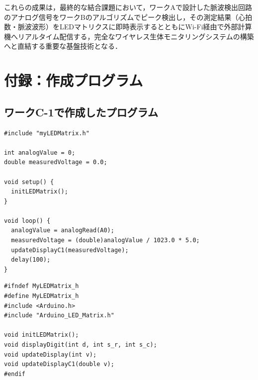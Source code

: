 これらの成果は，最終的な結合課題において，ワークAで設計した脈波検出回路のアナログ信号をワークBのアルゴリズムでピーク検出し，その測定結果（心拍数・脈波波形）をLEDマトリクスに即時表示するとともにWi-Fi経由で外部計算機へリアルタイム配信する，完全なワイヤレス生体モニタリングシステムの構築へと直結する重要な基盤技術となる．


\clearpage
\section{付録：作成プログラム}

\subsection{ワークC-1で作成したプログラム}

\begin{lstlisting}[caption={ワークC-1 メインスケッチ (myprm.ino)}, label={lst:c1_myprm}]
#include "myLEDMatrix.h"

int analogValue = 0;
double measuredVoltage = 0.0;

void setup() {
  initLEDMatrix();
}

void loop() {
  analogValue = analogRead(A0);
  measuredVoltage = (double)analogValue / 1023.0 * 5.0;
  updateDisplayC1(measuredVoltage);
  delay(100);
}
\end{lstlisting}

\begin{lstlisting}[caption={ワークC-1 LED制御ヘッダ (myLEDMatrix.h)}, label={lst:c1_myledmatrix_h}]
#ifndef MyLEDMatrix_h
#define MyLEDMatrix_h
#include <Arduino.h>
#include "Arduino_LED_Matrix.h"

void initLEDMatrix();
void displayDigit(int d, int s_r, int s_c);
void updateDisplay(int v);
void updateDisplayC1(double v);
#endif
\end{lstlisting}

